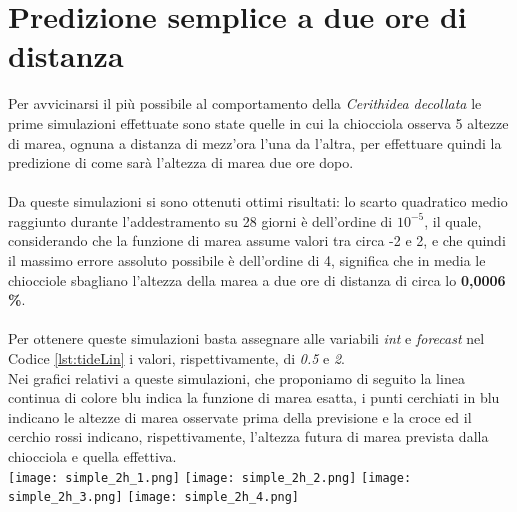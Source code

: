 	\section{Predizione semplice a due ore di distanza}
		Per avvicinarsi il più possibile al comportamento della \textit{Cerithidea decollata} le prime simulazioni effettuate sono state quelle  in cui la chiocciola osserva 5 altezze di marea, ognuna a distanza di mezz'ora l'una da l'altra, per effettuare quindi la predizione di come sarà l'altezza di marea due ore dopo.\\
		\\
		Da queste simulazioni si sono ottenuti ottimi risultati: lo scarto quadratico medio raggiunto durante l'addestramento su 28 giorni è dell'ordine di \(10^{-5}\), il quale, considerando che la funzione di marea assume valori tra circa -2 e 2, e che quindi il massimo errore assoluto possibile è dell'ordine di 4, significa che in media le chiocciole sbagliano l'altezza della marea a due ore di distanza di circa lo \textbf{0,0006 \%}.\\
		\\
		Per ottenere queste simulazioni basta assegnare alle variabili \textit{int} e \textit{forecast} nel Codice \ref{lst:tideLin} i valori, rispettivamente, di \textit{0.5} e \textit{2}.\\
		Nei grafici relativi a queste simulazioni, che proponiamo di seguito la linea continua di colore blu indica la funzione di marea esatta, i punti cerchiati in blu indicano le altezze di marea osservate prima della previsione e la croce ed il cerchio rossi indicano, rispettivamente, l'altezza futura di marea prevista dalla chiocciola e quella effettiva.\\
		\texttt{[image: simple\_2h\_1.png]}
		\texttt{[image: simple\_2h\_2.png]}
		\texttt{[image: simple\_2h\_3.png]}
		\texttt{[image: simple\_2h\_4.png]}
		\FloatBarrier
		
